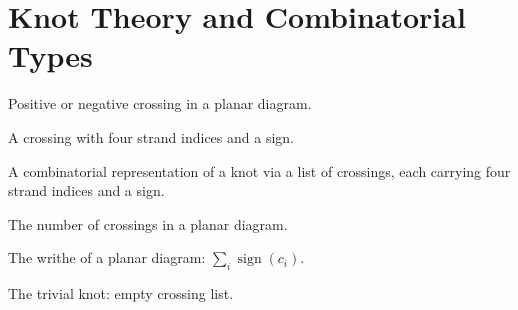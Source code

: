 \chapter{Knot Theory and Combinatorial Types}

\begin{definition}
  \label{def:crossing-sign}
  \leanok
  Positive or negative crossing in a planar diagram.
\end{definition}

\begin{definition}[Crossing]
  \label{def:crossing}
  \leanok
  A crossing with four strand indices and a sign.
\end{definition}

\begin{definition}
  \label{def:planar-diagram}
  A combinatorial representation of a knot via a list of crossings,
  each carrying four strand indices and a sign.
\end{definition}

\begin{definition}
  \label{def:crossing-count}
  \leanok
  The number of crossings in a planar diagram.
\end{definition}

\begin{definition}[Writhe]
  \label{def:writhe}
  \leanok
  The writhe of a planar diagram: $\sum_i \operatorname{sign}(c_i)$.
\end{definition}

\begin{definition}
  \label{def:unknot-diagram}
  \leanok
  The trivial knot: empty crossing list.
\end{definition}


